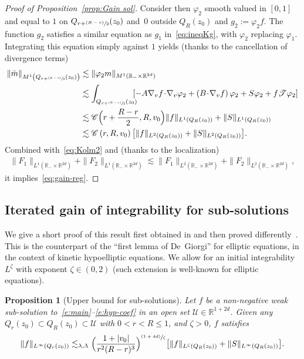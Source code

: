 \documentclass[10pt]{amsart}
\let\mathcal\mathscr
\newcommand{\psfrac}[2]{\sfrac{(#1)}{#2}}
\newtheorem{proposition}[theorem]{Proposition}
\theoremstyle{definition}
\theoremstyle{remark}
\newcommand\R{{\mathbb R}}
\newcommand{\cC}{\mathcal C}
\newcommand{\cU}{\mathcal{U}}
\newcommand{\cT}{\mathcal T}
\begin{document}
\begin{proof}[Proof of Proposition~\ref{prop:Gain sol}]
Consider then $\varphi_2$ smooth valued in $[0,1]$ and equal to
$1$ on $Q_{r+\psfrac{R-r}{2}}(z_0)$ and~$0$ outside $Q_R(z_0)$
and $g_2:=\varphi_2 f$. The function $g_2$ satisfies a similar
equation as $g_1$ in~\eqref{eq:ineqKg}, with $\varphi_2$
replacing $\varphi_1$. Integrating this equation simply against
$1$ yields (thanks to the cancellation of divergence terms)
\begin{align*}
\| \bar m \|_{M^1\left(Q_{r+\psfrac{R-r}{2}}(z_0)\right)}
& \lesssim
\| \varphi_2 m \|_{M^1(\R_- \times \R^{2d})} \\
& \lesssim \int_{Q_{r+\psfrac{R-r}{2}}(z_0)}
\hspace*{-2mm}[ -A\nabla_v
f\!\cdot\! \nabla_v \varphi_2 + \left( B \!\cdot\! \nabla_v f
\right)\varphi_2 + S\varphi_2 + f \cT \varphi_2] \\
& \lesssim \cC\Bigl(r+\frac{R-r}{2},R,v_0 \Bigr) \| f
\|_{L^1(Q_R(z_0))} + \| S \|_{L^1(Q_R(z_0))}\\
& \lesssim \cC\left(r,R,v_0
\right) \bigl[ \| f \|_{L^2(Q_R(z_0))} + \| S
\|_{L^2(Q_R(z_0))} \bigr].
\end{align*}
Combined with~\eqref{eq:Kolm2} and (thanks to the localization)
\begin{align*}
\| F_1 \|_{L^1(\R_- \times \R^{2d})} + \| F_2 \|_{L^1(\R_-
\times \R^{2d})} \lesssim \| F_1 \|_{L^2(\R_- \times
\R^{2d})} + \| F_2 \|_{L^2(\R_- \times \R^{2d})},
\end{align*}
it implies~\eqref{eq:gain-reg}.
\end{proof}

\subsection{Iterated gain of integrability for sub-solutions}

We give a short proof of this result first obtained in
\cite[Th.\,1.2]{pp} and then proved
differently~\cite[Th.\,12]{gimv}. This is the counterpart of
the ``first lemma of De~Giorgi'' for elliptic equations, in the
context of kinetic hypoelliptic equations. We allow for an
initial integrability~$L^\zeta$ with exponent $\zeta \in (0,2)$
(such extension is well-known for elliptic equations).

\begin{proposition}[Upper bound for sub-solutions]
\label{prop:1st lemma}
Let $f$ be a non-negative weak sub-solution
to~\eqref{e:main}--\eqref{e:hyp-coef} in an open set
$\cU \in \R^{1+2d}$. Given any
$Q_r(z_0) \subset Q_R(z_0) \subset \cU$ with $0<r<R \le 1$, and
$\zeta >0$, $f$ satisfies
\begin{equation*}
\| f \|_{L^\infty(Q_r(z_0))} \lesssim_{\lambda,\Lambda}
\Bigl( \frac{1+|v_0|}{r^2(R-r)^3}\Bigr)^{\psfrac{1+4d}{\zeta}}
\bigl[ \|f\|_{L^\zeta(Q_R(z_0))} + \|S\|_{L^\infty(Q_R(z_0))} \bigr].
\end{equation*}
\end{proposition}
\end{document}
